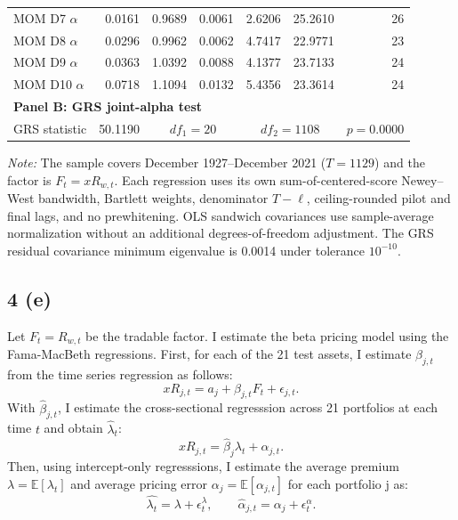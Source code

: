 \documentclass[11pt]{article}
\begin{document}
\begin{table}[H]
\begin{minipage}{0.99\textwidth}
\begin{tabular*}{\linewidth}{@{\extracolsep{\fill}}lrrrrrr@{}}
      MOM D7 $\alpha$ & 0.0161 & 0.9689 & 0.0061 & 2.6206 & 25.2610 & 26 \\
      MOM D8 $\alpha$ & 0.0296 & 0.9962 & 0.0062 & 4.7417 & 22.9771 & 23 \\
      MOM D9 $\alpha$ & 0.0363 & 1.0392 & 0.0088 & 4.1377 & 23.7133 & 24 \\
      MOM D10 $\alpha$ & 0.0718 & 1.1094 & 0.0132 & 5.4356 & 23.3614 & 24 \\
      \midrule
      \multicolumn{7}{l}{\textbf{Panel B: GRS joint-alpha test}} \\
      GRS statistic & 50.1190 & \multicolumn{2}{c}{$df_1=20$} & \multicolumn{2}{c}{$df_2=1108$} & $p=0.0000$ \\
      \bottomrule
    \end{tabular*}

    \par\smallskip
    {\footnotesize\raggedright \textit{Note:} The sample covers December 1927--December 2021 ($T=1129$) and the factor is $F_t=xR_{w,t}$. Each regression uses its own sum-of-centered-score Newey--West bandwidth, Bartlett weights, denominator $T-\ell$, ceiling-rounded pilot and final lags, and no prewhitening. OLS sandwich covariances use sample-average normalization without an additional degrees-of-freedom adjustment. The GRS residual covariance minimum eigenvalue is 0.0014 under tolerance $10^{-10}$.\par}
  \end{minipage}
\end{table}

\subsection*{4 (e)}
Let $F_t=R_{w,t}$ be the tradable factor. I estimate the beta pricing model using the 
Fama-MacBeth regressions. First, for each of the 21 test assets, I estimate $\beta_{j,t}$ from the time series regression as follows:
\[
xR_{j,t}=a_j+\beta_{j,t} F_t+\epsilon_{j,t}.
\]
With $\hat{\beta}_{j,t}$, I estimate the cross-sectional regresssion across 21 portfolios at each
time $t$ and obtain $\hat{\lambda}_{t}$: 
\[
xR_{j,t}=\hat{\beta}_j\lambda_t+\alpha_{j,t}.
\]
Then, using intercept-only regresssions, I estimate the average premium $\lambda = \mathbb{E}[\lambda_t]$ 
and  average pricing error $\alpha_j = \mathbb{E}[\alpha_{j,t}]$ for each portfolio j as: 
\[
\hat{\lambda_t}= \lambda + \epsilon_{t}^{\lambda},
\qquad
\hat{\alpha}_{j,t}= \alpha_j + \epsilon_{t}^{\alpha}.
\]

\end{document}

